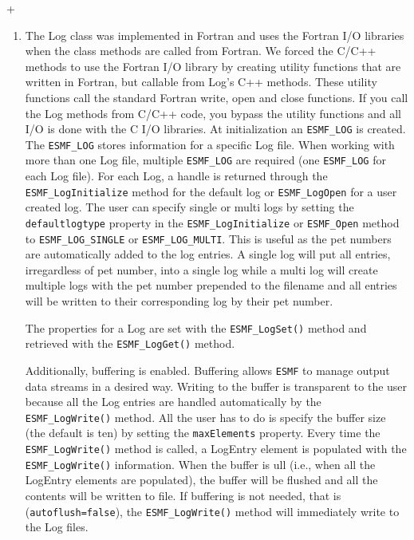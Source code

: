 +%
%
\begin{enumerate}
\item The Log class was implemented in Fortran and uses the Fortran I/O 
libraries when the class methods are called from Fortran. We forced the C/C++
methods to use the Fortran I/O library by creating utility functions that are
written in Fortran, but callable from Log's C++ methods.  These utility 
functions call the standard Fortran write, open and close functions.  If you
call the Log methods from C/C++ code, you bypass the utility functions and 
all I/O is done with the C I/O libraries.
At initialization an {\tt ESMF\_LOG} is created.  The {\tt ESMF\_LOG} stores 
information for a specific Log file.   When working with more than one 
Log file, multiple {\tt ESMF\_LOG} are required (one {\tt ESMF\_LOG} for each 
Log file).  For each Log, a handle is returned through the 
{\tt ESMF\_LogInitialize} method for the default log or {\tt ESMF\_LogOpen} 
for a
user created log.  The user can specify single or multi logs by setting the
{\tt defaultlogtype} property in the {\tt ESMF\_LogInitialize} or 
{\tt ESMF\_Open} method to {\tt ESMF\_LOG\_SINGLE} or {\tt ESMF\_LOG\_MULTI}.
This is useful as the pet numbers are automatically added to the log entries.
A single log will put all entries, irregardless of pet number, into a single
log while a multi log will create multiple logs with the pet number prepended
to the filename and all entries will be written to their corresponding log 
by their pet number.

The properties for a Log are set with the {\tt ESMF\_LogSet()} method and 
retrieved with the {\tt ESMF\_LogGet()} method.

Additionally, buffering is enabled.  Buffering allows {\tt ESMF} to manage 
output data streams in a desired way.  Writing to the buffer is transparent 
to the user because all the Log entries are handled automatically by the 
{\tt ESMF\_LogWrite()} method.  All the user has to do is specify the buffer
size (the default is ten) by setting the {\tt maxElements} property.  Every 
time the {\tt ESMF\_LogWrite()} method is called, a LogEntry element is 
populated with the {\tt ESMF\_LogWrite()} information.  When the buffer is 
ull (i.e., when all the LogEntry elements are populated), the buffer will be 
flushed and all the contents will be written to file.  If buffering is not 
needed, that is ({\tt autoflush=false}), the {\tt ESMF\_LogWrite()} method 
will immediately write to the Log files. 


\end{enumerate}




